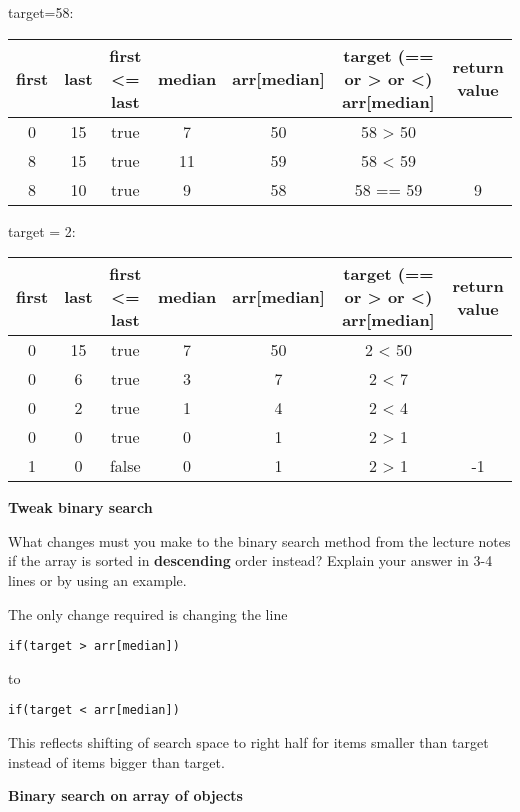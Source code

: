 \begin{questions}
\begin{solution}
target=58:
\vskip 0.2cm
\begin{tabular}{c | c | c | c | c | c | c} 
\hline
first &	last &	first <= last & median &	 arr[median] & target (== or > or <) arr[median] & return value\\
\hline
0 & 15 & true & 7 & 50 & 58 > 50 & \\
8 & 15 & true & 11 & 59 & 58 < 59 & \\
8 & 10 & true & 9 & 58 & 58 == 59 & 9\\
\hline
\end{tabular}
\vskip 0.5cm

target = 2:
\vskip 0.2cm
\begin{tabular}{c | c | c | c | c | c | c} 
\hline
first &	last &	first <= last & median & arr[median] & target (== or > or <) arr[median] & return value\\
\hline
0 & 15 & true & 7 & 50 & 2 < 50 & \\
0 & 6 & true & 3 & 7 & 2 < 7 & \\
0 & 2 & true & 1 & 4 & 2 < 4 & \\
0 & 0 & true & 0 & 1 & 2 > 1 & \\
1 & 0 & false & 0 & 1 & 2 > 1 & -1\\
\hline
\end{tabular}
\normalsize
\end{solution}

\question \textbf{Tweak binary search}

What changes must you make to the binary search method from the lecture notes if the array is sorted in \textbf{descending} order instead? Explain your answer in 3-4 lines or by using an example.

\begin{solution}
The only change required is changing the line

\begin{lstlisting}
if(target > arr[median])
\end{lstlisting}

to 

\begin{lstlisting}
if(target < arr[median])
\end{lstlisting}

This reflects shifting of search space to right half for items smaller than target instead of items bigger than target.
\end{solution}

\question \textbf{Binary search on array of objects}


\end{questions}
